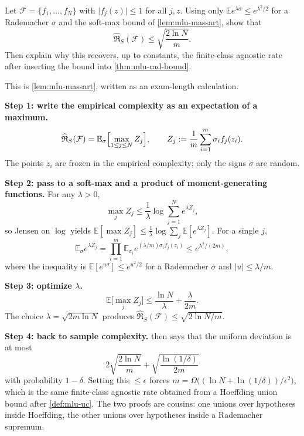 \begin{exercise}
\label{ex:mlu-rad-finite}
Let $\mathcal{F}=\{f_1,\dots,f_N\}$ with $\lvert f_j(z)\rvert\le 1$ for all $j,z$. Using only $\mathbb{E}e^{\lambda\sigma}\le e^{\lambda^2/2}$ for a Rademacher $\sigma$ and the soft-max bound of \cref{lem:mlu-massart}, show that
\[
\widehat{\mathfrak{R}}_S(\mathcal{F})\le\sqrt{\frac{2\ln N}{m}}.
\]
Then explain why this recovers, up to constants, the finite-class agnostic rate after inserting the bound into \cref{thm:mlu-rad-bound}.
\end{exercise}

\begin{solution}
This is \cref{lem:mlu-massart}, written as an exam-length calculation.

\textbf{Step 1: write the empirical complexity as an expectation of a maximum.}
\[
\widehat{\mathfrak{R}}_S(\mathcal{F})
=
\mathbb{E}_{\sigma}
\Bigl[\max_{1\le j\le N}Z_j\Bigr],
\qquad
Z_j
:=
\frac1m\sum_{i=1}^m\sigma_i f_j(z_i).
\]
The points $z_i$ are frozen in the empirical complexity; only the signs $\sigma$ are random.

\textbf{Step 2: pass to a soft-max and a product of moment-generating functions.}
For any $\lambda>0$,
\[
\max_j Z_j
\le
\frac1\lambda\log\sum_{j=1}^N e^{\lambda Z_j},
\]
so Jensen on $\log$ yields $\mathbb{E}[\max Z_j]\le\frac1\lambda\log\sum_j\mathbb{E}[e^{\lambda Z_j}]$. For a single $j$,
\[
\mathbb{E}_{\sigma}e^{\lambda Z_j}
=
\prod_{i=1}^m\mathbb{E}_{\sigma_i}e^{(\lambda/m)\sigma_i f_j(z_i)}
\le
e^{\lambda^2/(2m)},
\]
where the inequality is $\mathbb{E}[e^{u\sigma}]\le e^{u^2/2}$ for a Rademacher $\sigma$ and $\lvert u\rvert\le\lambda/m$.

\textbf{Step 3: optimize $\lambda$.}
\[
\mathbb{E}\bigl[\max_j Z_j\bigr]
\le
\frac{\ln N}{\lambda}+\frac{\lambda}{2m}.
\]
The choice $\lambda=\sqrt{2m\ln N}$ produces $\widehat{\mathfrak{R}}_S(\mathcal{F})\le\sqrt{2\ln N/m}$.

\textbf{Step 4: back to sample complexity.}
 then says that the uniform deviation is at most
\[
2\sqrt{\frac{2\ln N}{m}}+\sqrt{\frac{\ln(1/\delta)}{2m}}
\]
with probability $1-\delta$. Setting this $\le\epsilon$ forces $m=\Omega\bigl((\ln N+\ln(1/\delta))/\epsilon^2\bigr)$, which is the same finite-class agnostic rate obtained from a Hoeffding union bound after \cref{def:mlu-uc}. The two proofs are cousins: one unions over hypotheses inside Hoeffding, the other unions over hypotheses inside a Rademacher supremum.
\end{solution}


